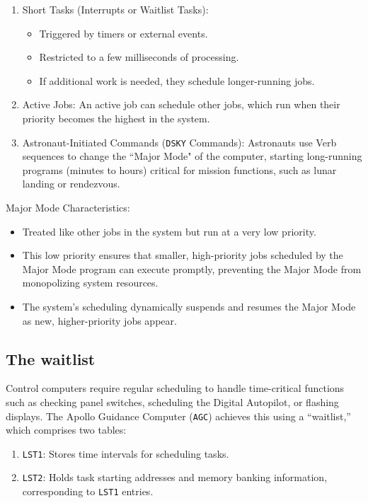 \documentclass[refcap, oxford]{ahsan}
\begin{document}
\begin{enumerate}
    \item Short Tasks (Interrupts or Waitlist Tasks):
        \begin{itemize}
            \item Triggered by timers or external events.
            \item Restricted to a few milliseconds of processing.
            \item If additional work is needed, they schedule longer-running jobs.
        \end{itemize}

    \item Active Jobs: An active job can schedule other jobs, which run when their
        priority becomes the highest in the system.
    \item Astronaut-Initiated Commands (\texttt{DSKY} Commands): Astronauts use Verb
        sequences to change the ``Major Mode" of the computer, starting long-running
        programs (minutes to hours) critical for mission functions, such as lunar
        landing or rendezvous.
\end{enumerate}

Major Mode Characteristics:
\begin{itemize}
    \item Treated like other jobs in the system but run at a very low priority.
    \item This low priority ensures that smaller, high-priority jobs scheduled by the
        Major Mode program can execute promptly, preventing the Major Mode from
        monopolizing system resources.
    \item The system's scheduling dynamically suspends and resumes the Major Mode as
        new, higher-priority jobs appear.
\end{itemize}


\subsection{The waitlist}

Control computers require regular scheduling to handle time-critical functions such as
checking panel switches, scheduling the Digital Autopilot, or flashing displays. The
Apollo Guidance Computer (\texttt{AGC}) achieves this using a ``waitlist,'' which
comprises two tables:

\begin{enumerate}
    \item \texttt{LST1}: Stores time intervals for scheduling tasks.
    \item \texttt{LST2}: Holds task starting addresses and memory banking information,
        corresponding to \texttt{LST1} entries.
\end{enumerate}
\end{document}
